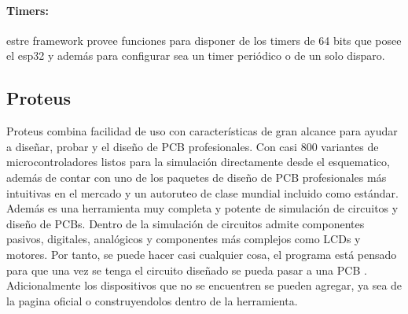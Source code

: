 \paragraph{Timers:} estre framework provee funciones para disponer de los timers de 64 bits que posee el esp32 y además para configurar sea un timer periódico o de un solo disparo.

\subsection{Proteus}

Proteus combina facilidad de uso con características de gran alcance para ayudar a diseñar, probar y el diseño de PCB profesionales. Con casi 800 variantes de microcontroladores listos para la simulación directamente desde el esquematico, además de contar con uno de los paquetes de diseño de PCB profesionales más intuitivas en el mercado y un autoruteo de clase mundial incluido como estándar. \cite{Prot1} \\

Además es una herramienta muy completa y potente de simulación de circuitos y diseño de PCBs. Dentro de la simulación de circuitos admite componentes pasivos, digitales, analógicos y componentes más complejos como LCDs y motores. Por tanto, se puede hacer casi cualquier cosa, el programa está pensado para que una vez se tenga el circuito diseñado se pueda pasar a una PCB \cite{Prot2}.
Adicionalmente los dispositivos que no se encuentren se pueden agregar, ya sea de la pagina oficial o construyendolos dentro de la herramienta.
